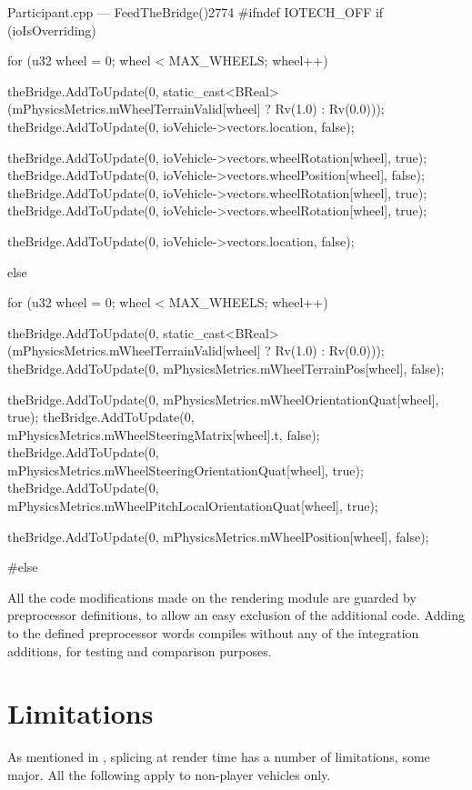 \begin{codelist}{Participant.cpp --- FeedTheBridge()}{2774}
#ifndef IOTECH_OFF
	if (ioIsOverriding) {
		for (u32 wheel = 0; wheel < MAX_WHEELS; wheel++) {
			theBridge.AddToUpdate(0, static_cast<BReal>(mPhysicsMetrics.mWheelTerrainValid[wheel] ? Rv(1.0) : Rv(0.0)));
			theBridge.AddToUpdate(0, ioVehicle->vectors.location, false);

			theBridge.AddToUpdate(0, ioVehicle->vectors.wheelRotation[wheel], true);
			theBridge.AddToUpdate(0, ioVehicle->vectors.wheelPosition[wheel], false);
			theBridge.AddToUpdate(0, ioVehicle->vectors.wheelRotation[wheel], true);
			theBridge.AddToUpdate(0, ioVehicle->vectors.wheelRotation[wheel], true);

			theBridge.AddToUpdate(0, ioVehicle->vectors.location, false);
		}
	}
	else {
		for (u32 wheel = 0; wheel < MAX_WHEELS; wheel++) {
			theBridge.AddToUpdate(0, static_cast<BReal>(mPhysicsMetrics.mWheelTerrainValid[wheel] ? Rv(1.0) : Rv(0.0)));
			theBridge.AddToUpdate(0, mPhysicsMetrics.mWheelTerrainPos[wheel], false);

			theBridge.AddToUpdate(0, mPhysicsMetrics.mWheelOrientationQuat[wheel], true);
			theBridge.AddToUpdate(0, mPhysicsMetrics.mWheelSteeringMatrix[wheel].t, false);
			theBridge.AddToUpdate(0, mPhysicsMetrics.mWheelSteeringOrientationQuat[wheel], true);
			theBridge.AddToUpdate(0, mPhysicsMetrics.mWheelPitchLocalOrientationQuat[wheel], true);

			theBridge.AddToUpdate(0, mPhysicsMetrics.mWheelPosition[wheel], false);
		}
	}
#else
\end{codelist}

All the code modifications made on the rendering module are guarded by preprocessor definitions, to allow an easy exclusion of the additional code. Adding  to the defined preprocessor words compiles without any of the integration additions, for testing and comparison purposes.

\section{Limitations}\label{sc:integration:limitations}

As mentioned in , splicing at render time has a number of limitations, some major. All the following apply to non-player vehicles only.

